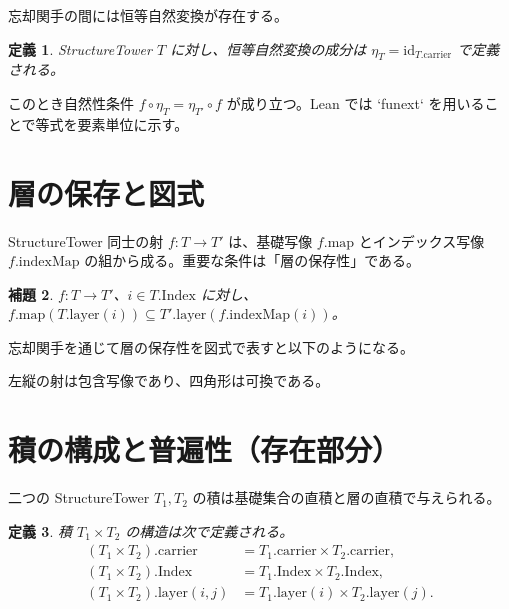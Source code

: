 \documentclass[a4paper]{ltjsarticle}
\newtheorem{definition}{定義}[section]
\newtheorem{lemma}[definition]{補題}
\begin{document}
忘却関手の間には恒等自然変換が存在する。

\begin{definition}
StructureTower $T$ に対し、恒等自然変換の成分は $\eta_T = \mathrm{id}_{T.\mathrm{carrier}}$ で定義される。
\end{definition}

\noindent このとき自然性条件 $f \circ \eta_T = \eta_{T'} \circ f$ が成り立つ。Lean では `funext` を用いることで等式を要素単位に示す。

\section{層の保存と図式}

StructureTower 同士の射 $f : T \to T'$ は、基礎写像 $f.\mathrm{map}$ とインデックス写像 $f.\mathrm{indexMap}$ の組から成る。重要な条件は「層の保存性」である。

\begin{lemma}
$f : T \to T'$、$i \in T.\mathrm{Index}$ に対し、$f.\mathrm{map}(T.\mathrm{layer}(i)) \subseteq T'.\mathrm{layer}(f.\mathrm{indexMap}(i))$。
\end{lemma}

忘却関手を通じて層の保存性を図式で表すと以下のようになる。

\begin{center}
\end{center}

左縦の射は包含写像であり、四角形は可換である。

\section{積の構成と普遍性（存在部分）}

二つの StructureTower $T_1, T_2$ の積は基礎集合の直積と層の直積で与えられる。

\begin{definition}
積 $T_1 \times T_2$ の構造は次で定義される。
\begin{align*}
  (T_1 \times T_2).\mathrm{carrier} &= T_1.\mathrm{carrier} \times T_2.\mathrm{carrier},\\
  (T_1 \times T_2).\mathrm{Index} &= T_1.\mathrm{Index} \times T_2.\mathrm{Index},\\
  (T_1 \times T_2).\mathrm{layer}(i,j) &= T_1.\mathrm{layer}(i) \times T_2.\mathrm{layer}(j).
\end{align*}
\end{definition}
\end{document}
